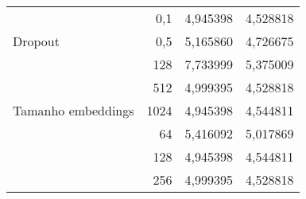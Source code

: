\begin{table}[]
{\begin{tabular}{lr|rr}
            \multicolumn{1}{l|}{}                                                                                     & 0,1                                                                          & \multicolumn{1}{r|}{\cellcolor[HTML]{FFF5E1}4,945398}                      & \cellcolor[HTML]{FFF5E1}4,528818 \\
            \multicolumn{1}{l|}{\multirow{-2}{*}{Dropout}}                                                            & 0,5                                                                          & \multicolumn{1}{r|}{5,165860}                                              & 4,726675                         \\ \hline
            \multicolumn{1}{l|}{}                                                                                     & 128                                                                          & \multicolumn{1}{r|}{7,733999}                                              & 5,375009                         \\
            \multicolumn{1}{l|}{}                                                                                     & 512                                                                          & \multicolumn{1}{r|}{4,999395}                                              & \cellcolor[HTML]{FFF5E1}4,528818 \\
            \multicolumn{1}{l|}{\multirow{-3}{*}{Tamanho embeddings}}                                                 & 1024                                                                         & \multicolumn{1}{r|}{\cellcolor[HTML]{FFF5E1}4,945398}                      & 4,544811                         \\ \hline
            \multicolumn{1}{l|}{}                                                                                     & 64                                                                           & \multicolumn{1}{r|}{5,416092}                                              & 5,017869                         \\
            \multicolumn{1}{l|}{}                                                                                     & 128                                                                          & \multicolumn{1}{r|}{\cellcolor[HTML]{FFF5E1}4,945398}                      & 4,544811                         \\
            \multicolumn{1}{l|}{}                                                                                     & 256                                                                          & \multicolumn{1}{r|}{4,999395}                                              & \cellcolor[HTML]{FFF5E1}4,528818 \\

\end{tabular}}
\end{table}
